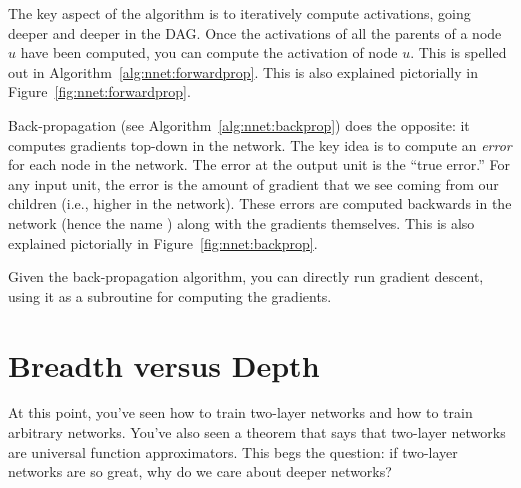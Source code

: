 
The key aspect of the  algorithm is to
iteratively compute activations, going deeper and deeper in the DAG.
Once the activations of all the parents of a node $u$ have been
computed, you can compute the activation of node $u$.  This is spelled
out in Algorithm~\ref{alg:nnet:forwardprop}.  This is also explained
pictorially in Figure~\ref{fig:nnet:forwardprop}.


Back-propagation (see Algorithm~\ref{alg:nnet:backprop}) does the
opposite: it computes gradients top-down in the network.  The key idea
is to compute an \emph{error} for each node in the network.  The error
at the output unit is the ``true error.''  For any input unit, the
error is the amount of gradient that we see coming from our children
(i.e., higher in the network).  These errors are computed backwards in
the network (hence the name ) along with the
gradients themselves.  This is also explained pictorially in
Figure~\ref{fig:nnet:backprop}.

Given the back-propagation algorithm, you can directly run gradient
descent, using it as a subroutine for computing the gradients.

\section{Breadth versus Depth}

At this point, you've seen how to train two-layer networks and how to
train arbitrary networks.  You've also seen a theorem that says that
two-layer networks are universal function approximators.  This begs
the question: if two-layer networks are so great, why do we care about
deeper networks?

